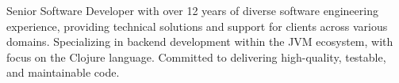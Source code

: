 

\begin{cvparagraph}

Senior Software Developer with over 12 years of diverse software engineering experience, providing technical solutions and support for clients across various domains. Specializing in backend development within the JVM ecosystem, with focus on the Clojure language. Committed to delivering high-quality, testable, and maintainable code.
\end{cvparagraph}
